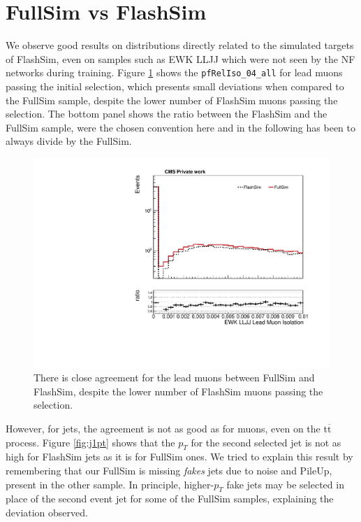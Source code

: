 \section{FullSim vs FlashSim}

We observe good results on distributions directly related to the simulated targets of FlashSim, even on samples such as EWK LLJJ which were not seen by the NF networks during training. Figure \ref{fig:selmuonpt} shows the \texttt{pfRelIso\_04\_all} for lead muons passing the initial selection, which presents small deviations when compared to the FullSim sample, despite the lower number of FlashSim muons passing the selection. The bottom panel shows the ratio between the FlashSim and the FullSim sample, were the chosen convention here and in the following has been to always divide by the FullSim.

\begin{figure}
    \centering
    \includegraphics[width=\linewidth]{gfx/ch6/EWK_LLJJ_LeadMuon_pfRelIso04_all___PreSel_log.pdf}
    \caption[Lead muon isolation]{There is close agreement for the lead muons between FullSim and FlashSim, despite the lower number of FlashSim muons passing the selection.}
    \label{fig:selmuonpt}
\end{figure}

However, for jets, the agreement is not as good as for muons, even on the t$\overline{\text{t}}$ process. Figure \ref{fig:j1pt} shows that the $p_T$ for the second selected jet is not as high for FlashSim jets as it is for FullSim ones. We tried to explain this result by remembering that our FullSim is missing \emph{fakes} jets due to noise and PileUp, present in the other sample. In principle, higher-$p_T$ fake jets may be selected in place of the second event jet for some of the FullSim samples, explaining the deviation observed. 

